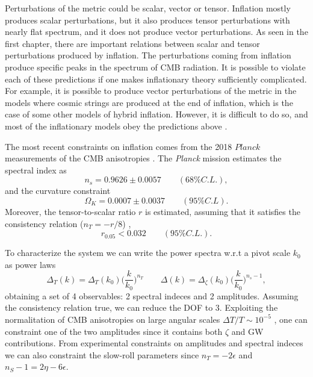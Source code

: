 \documentclass[11pt,a4paper,twoside]{book}
\begin{document}
 Perturbations of the metric could be scalar, vector or tensor. Inflation mostly produces scalar perturbations, but it also produces tensor perturbations with nearly flat spectrum, and it does not produce vector perturbations. As seen in the first chapter,  there are important relations between  scalar and tensor perturbations produced by inflation.
 The perturbations coming from inflation produce specific peaks in the spectrum of CMB radiation.
 It is possible to violate each of these predictions if one makes inflationary theory sufficiently complicated. For example, it is possible to produce vector perturbations of the metric in the models where cosmic strings are produced at the end of inflation, which is the case of some other models of hybrid inflation. However, it is difficult to do so, and most of the inflationary models obey the predictions above \cite{Chap2:Linde_HystoryInflation}.
 
 The most recent constraints on inflation comes from the 2018 $ Planck $ measurements of the CMB anisotropies \cite{Chap2:Planck2018}. The \textit{Planck} mission estimates the spectral index as
 \begin{equation}
 	\label{spectral index}
 	n_{s}= 0.9626 \pm 0.0057  \qquad (68\% C.L.),
 \end{equation}
and the curvature constraint
 \begin{equation}
 	\label{curvatureConstraint}
 	\Omega_{K}= 0.0007 \pm 0.0037 \qquad  (95\% C.L). 
 \end{equation}
Moreover, the tensor-to-scalar ratio $ r $ is estimated, assuming that it satisfies the consistency relation  ($ n_{T} = -r/8 $) \cite{Intro:ConstraintsOnr},
\begin{equation}
	r_{0.05} < 0.032 \qquad (95\% C.L.).
\end{equation}

To characterize the system we can write the power spectra w.r.t a pivot scale $ k_{0} $ as power laws
\begin{equation}
	\Delta_{T}(k) = \Delta_{T}(k_{0})\Big (\frac{k}{k_{0}}\Big)^{n_{T}} \qquad \Delta(k) = \Delta_{\zeta}(k_{0})\Big (\frac{k}{k_{0}}\Big)^{n_{s}-1},
\end{equation}
obtaining a set of 4 observables: 2 spectral indeces and 2 amplitudes.
Assuming the consistency relation true, we can reduce the DOF to 3.  Exploiting the normalitation of CMB anisotropies on large angular scales $ \Delta T/T \sim 10^{-5}$ \cite{Chap2:Wilkinson}, one can constraint one of the two amplitudes since it contains both $\zeta$ and GW contributions.
From experimental constraints on amplitudes and spectral indeces we can also constraint  the slow-roll parameters since $ n_{T}=-2\epsilon $ and $ n_{S}-1=2\eta - 6\epsilon $.
\end{document}
